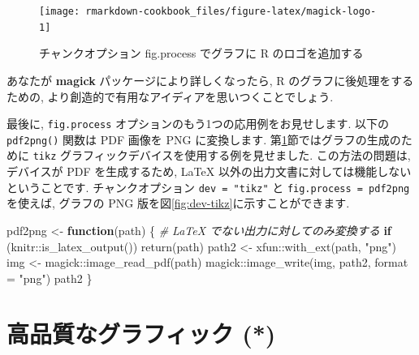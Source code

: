 \documentclass[
  11pt,
  lualatex,
  ja=standard]{bxjsreport}
\newenvironment{Shaded}{\begin{snugshade}}{\end{snugshade}}
\newcommand{\AttributeTok}[1]{\textcolor[rgb]{0.77,0.63,0.00}{#1}}
\newcommand{\CommentTok}[1]{\textcolor[rgb]{0.56,0.35,0.01}{\textit{#1}}}
\newcommand{\ControlFlowTok}[1]{\textcolor[rgb]{0.13,0.29,0.53}{\textbf{#1}}}
\newcommand{\FunctionTok}[1]{\textcolor[rgb]{0.00,0.00,0.00}{#1}}
\newcommand{\NormalTok}[1]{#1}
\newcommand{\OtherTok}[1]{\textcolor[rgb]{0.56,0.35,0.01}{#1}}
\newcommand{\SpecialCharTok}[1]{\textcolor[rgb]{0.00,0.00,0.00}{#1}}
\newcommand{\StringTok}[1]{\textcolor[rgb]{0.31,0.60,0.02}{#1}}
\begin{document}
\begin{figure}

{\centering \texttt{[image: rmarkdown-cookbook\_files/figure-latex/magick-logo-1]} 

}

\caption{チャンクオプション fig.process でグラフに R のロゴを追加する}\label{fig:magick-logo}
\end{figure}

あなたが \textbf{magick} パッケージにより詳しくなったら, R のグラフに後処理をするための, より創造的で有用なアイディアを思いつくことでしょう.

最後に, \texttt{fig.process} オプションのもう1つの応用例をお見せします. 以下の \texttt{pdf2png()} 関数は PDF 画像を PNG に変換します. 第\ref{graphical-device}節ではグラフの生成のために \texttt{tikz} グラフィックデバイスを使用する例を見せました. この方法の問題は, デバイスが PDF を生成するため, LaTeX 以外の出力文書に対しては機能しないということです. チャンクオプション \texttt{dev = "tikz"} と \texttt{fig.process = pdf2png} を使えば, グラフの PNG 版を図\ref{fig:dev-tikz}に示すことができます.

\begin{Shaded}
\begin{Highlighting}[numbers=left,,]
\NormalTok{pdf2png }\OtherTok{\textless{}{-}} \ControlFlowTok{function}\NormalTok{(path) \{}
  \CommentTok{\# LaTeX でない出力に対してのみ変換する}
  \ControlFlowTok{if}\NormalTok{ (knitr}\SpecialCharTok{::}\FunctionTok{is\_latex\_output}\NormalTok{()) }
    \FunctionTok{return}\NormalTok{(path)}
\NormalTok{  path2 }\OtherTok{\textless{}{-}}\NormalTok{ xfun}\SpecialCharTok{::}\FunctionTok{with\_ext}\NormalTok{(path, }\StringTok{"png"}\NormalTok{)}
\NormalTok{  img }\OtherTok{\textless{}{-}}\NormalTok{ magick}\SpecialCharTok{::}\FunctionTok{image\_read\_pdf}\NormalTok{(path)}
\NormalTok{  magick}\SpecialCharTok{::}\FunctionTok{image\_write}\NormalTok{(img, path2, }\AttributeTok{format =} \StringTok{"png"}\NormalTok{)}
\NormalTok{  path2}
\NormalTok{\}}
\end{Highlighting}
\end{Shaded}

\hypertarget{graphical-device}{%
\section{高品質なグラフィック (*)}\label{graphical-device}}
\end{document}
